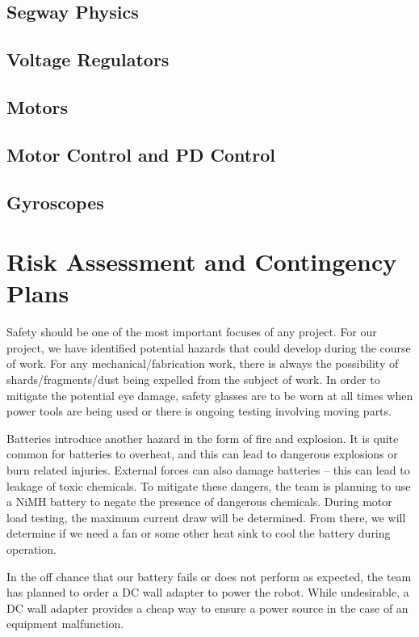 \documentclass[11pt]{report}
\begin{document}
\begin{spacing}{1.5}
\subsection*{Segway Physics}

\subsection*{Voltage Regulators}

\subsection*{Motors}

\subsection*{Motor Control and PD Control}

\subsection*{Gyroscopes}

\section*{Risk Assessment and Contingency Plans} %

Safety should be one of the most important focuses of any project. For our project, we have identified potential hazards that could develop during the course of work. For any mechanical/fabrication work, there is always the possibility of shards/fragments/dust being expelled from the subject of work. In order to mitigate the potential eye damage, safety glasses are to be worn at all times when power tools are being used or there is ongoing testing involving moving parts. 

Batteries introduce another hazard in the form of fire and explosion. It is quite common for batteries to overheat, and this can lead to dangerous explosions or burn related injuries. External forces can also damage batteries – this can lead to leakage of toxic chemicals. To mitigate these dangers, the team is planning to use a NiMH battery to negate the presence of dangerous chemicals. During motor load testing, the maximum current draw will be determined. From there, we will determine if we need a fan or some other heat sink to cool the battery during operation. 

In the off chance that our battery fails or does not perform as expected, the team has planned to order a DC wall adapter to power the robot. While undesirable, a DC wall adapter provides a cheap way to ensure a power source in the case of an equipment malfunction. 


\end{spacing}
\end{document}
